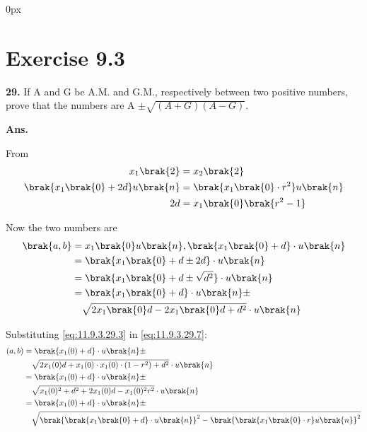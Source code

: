\documentclass[journal,12pt,twocolumn]{IEEEtran}
\begin{document}
\parindent 0px


\vspace{3cm}
\title{}
\author{EE23BTECH11042 -  Khusinadha Naik$^{*}$
}
\maketitle
\newpage
\bigskip



\section*{Exercise 9.3}

\noindent \textbf{29.} \hspace{2pt}If A and G be A.M. and G.M., respectively between two positive numbers, prove that the numbers are A $\pm \sqrt{(A+G)(A-G)}$. 

\noindent \textbf{Ans.}\\
\fi

\begin{table}[h]

\end{table}

\noindent From 
\begin{align}
x_1\brak{2} &= x_2\brak{2} \\
\brak{x_1\brak{0} + 2d }u\brak{n} &= \brak{x_1\brak{0}\cdot r^{2}}u\brak{n} \\
2d &= x_1\brak{0}\brak{r^{2} - 1}  \label{eq:11.9.3.29.3}
\end{align}

Now the two numbers are 
\begin{align}
\brak{a,b} &= x_1\brak{0}u\brak{n} , \brak{x_1\brak{0} + d}\cdot u\brak{n} \\
&=\brak{x_1\brak{0} + d \pm 2d}\cdot u\brak{n} \\
&=\brak{x_1\brak{0} + d \pm \sqrt{d^{2}}}\cdot u\brak{n} \\
\notag &=\brak{x_1\brak{0} + d }\cdot u\brak{n}\pm\\
& \quad  \sqrt{2x_1\brak{0}d - 2x_1\brak{0}d + d^{2}}\cdot  u\brak{n} \label{eq:11.9.3.29.7}
\end{align}

Substituting \eqref{eq:11.9.3.29.3} in \eqref{eq:11.9.3.29.7}:
\begin{align}
\notag (a,b) &= \brak{x_1(0) + d }\cdot u\brak{n}\pm \\ 
& \quad \sqrt{2x_1(0)d + x_1(0) \cdot x_1(0) \cdot (1 - r^{2}) + d^{2}}\cdot u\brak{n} \\
\notag &= \brak{x_1(0) + d }\cdot u\brak{n}\pm \\ 
& \quad \sqrt{x_1(0)^2 + d^2 + 2x_1(0)d - x_1(0)^2r^2}\cdot u\brak{n} \\
\notag &= \brak{x_1(0) + d }\cdot u\brak{n}\pm \\
& \quad \sqrt{ \brak{\brak{x_1\brak{0} + d}\cdot u\brak{n}}^2 - \brak{\brak{x_1\brak{0}\cdot r}u\brak{n}}^2}\label{eq:11.9.3.29.10}
\end{align}
\pagebreak
\end{document}
